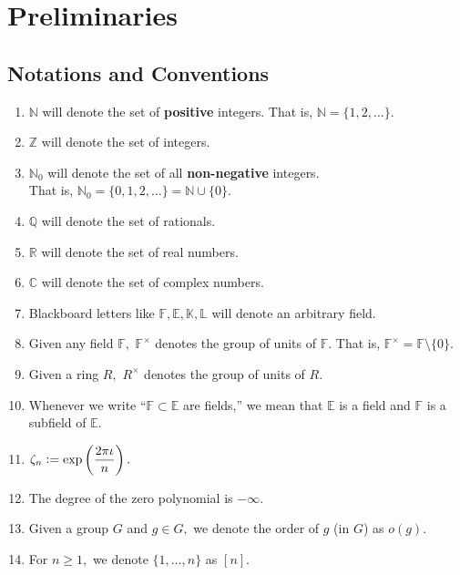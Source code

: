 \chapter{Preliminaries} \label{chap:00}

\section{Notations and Conventions}
\begin{enumerate}
    \item $\mathbb{N}$ will denote the set of \textbf{positive} integers. That is, $\mathbb{N} = \{1, 2, \ldots\}.$
    \item $\mathbb{Z}$ will denote the set of integers.
    \item $\mathbb{N}_0$ will denote the set of all \textbf{non-negative} integers. \\
    That is, $\mathbb{N}_0 = \{0, 1, 2, \ldots\} = \mathbb{N} \cup \{0\}.$
    \item $\mathbb{Q}$ will denote the set of rationals.
    \item $\mathbb{R}$ will denote the set of real numbers.
    \item $\mathbb{C}$ will denote the set of complex numbers.
    \item Blackboard letters like $\mathbb{F}, \mathbb{E}, \mathbb{K}, \mathbb{L}$ will denote an arbitrary field.
    \item Given any field $\mathbb{F},$ $\mathbb{F}^\times$ denotes the group of units of $\mathbb{F}.$ That is, $\mathbb{F}^\times = \mathbb{F}\setminus\{0\}.$
    \item Given a ring $R,$ $R^\times$ denotes the group of units of $R.$ 
    \item Whenever we write ``$\mathbb{F} \subset \mathbb{E}$ are fields,'' we mean that $\mathbb{E}$ is a field and $\mathbb{F}$ is a subfield of $\mathbb{E}.$
    \item $\zeta_n \vcentcolon= \exp\left(\dfrac{2\pi\iota}{n}\right).$
    \item The degree of the zero polynomial is $-\infty.$
    \item Given a group $G$ and $g \in G,$ we denote the order of $g$ (in $G$) as $o(g).$
    \item For $n \ge 1,$ we denote $\{1, \ldots, n\}$ as $[n].$
\end{enumerate}

